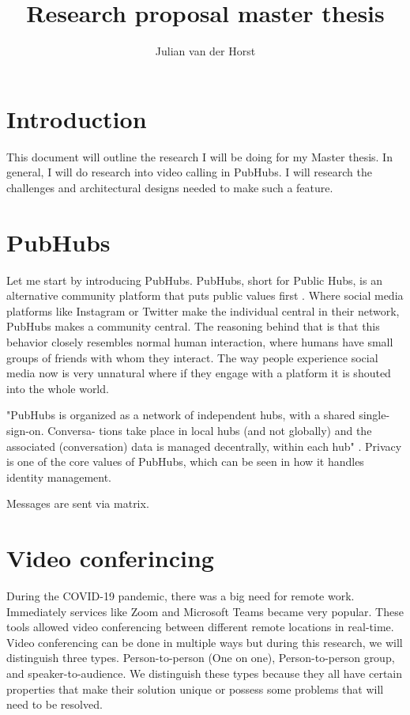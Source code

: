 \documentclass[11pt,a4paper]{article}
\title{Research proposal master thesis}
\author{Julian van der Horst}
\begin{document}
 
\maketitle
\section{Introduction}
This document will outline the research I will be doing for my Master thesis. In general, I will do research into video calling in PubHubs. I will research the challenges and architectural designs needed to make such a feature. 
\section{PubHubs}
Let me start by introducing PubHubs. PubHubs, short for Public Hubs, is an alternative community platform that puts public values first \cite{PH}. Where social media platforms like Instagram or Twitter make the individual central in their network, PubHubs makes a community central. The reasoning behind that is that this behavior closely resembles normal human interaction, where humans have small groups of friends with whom they interact. The way people experience social media now is very unnatural where if they engage with a platform it is shouted into the whole world.

"PubHubs is organized as a network of independent hubs, with a shared single-sign-on. Conversa-
tions take place in local hubs (and not globally) and the associated (conversation) data is managed
decentrally, within each hub" \cite{PH}. Privacy is one of the core values of PubHubs, which can be seen in how it handles identity management. 

Messages are sent via matrix. 

\section{Video conferincing}
During the COVID-19 pandemic, there was a big need for remote work. Immediately services like Zoom \cite{Zoom} and Microsoft Teams \cite{MSTeams} became very popular. These tools allowed video conferencing between different remote locations in real-time. Video conferencing can be done in multiple ways but during this research, we will distinguish three types. Person-to-person (One on one), Person-to-person group, and speaker-to-audience. We distinguish these types because they all have certain properties that make their solution unique or possess some problems that will need to be resolved.
\end{document}
